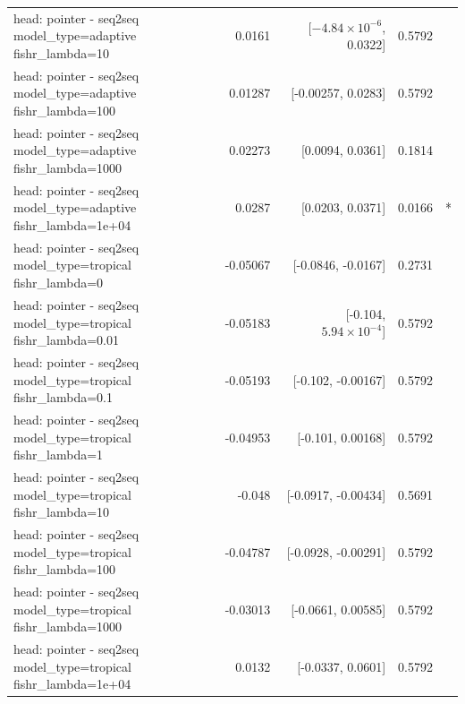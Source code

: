 \documentclass[10pt]{article}
\makeatletter
\newcommand{\stackcell}[1]{\begin{tabular}[t]{@{}l@{}}#1\end{tabular}}
\makeatother
\begin{document}
{\begin{longtable}{lrrrl}
\stackcell{head: pointer - seq2seq\\\footnotesize model\_type=adaptive fishr\_lambda=10 } & 0.0161 & [$-4.84\times10^{-6}$, 0.0322] & 0.5792 & \\
\stackcell{head: pointer - seq2seq\\\footnotesize model\_type=adaptive fishr\_lambda=100 } & 0.01287 & [-0.00257, 0.0283] & 0.5792 & \\
\stackcell{head: pointer - seq2seq\\\footnotesize model\_type=adaptive fishr\_lambda=1000 } & 0.02273 & [0.0094, 0.0361] & 0.1814 & \\
\stackcell{head: pointer - seq2seq\\\footnotesize model\_type=adaptive fishr\_lambda=1e+04 } & 0.0287 & [0.0203, 0.0371] & 0.0166 & *\\
\stackcell{head: pointer - seq2seq\\\footnotesize model\_type=tropical fishr\_lambda=0 } & -0.05067 & [-0.0846, -0.0167] & 0.2731 & \\
\stackcell{head: pointer - seq2seq\\\footnotesize model\_type=tropical fishr\_lambda=0.01 } & -0.05183 & [-0.104, $5.94\times10^{-4}$] & 0.5792 & \\
\stackcell{head: pointer - seq2seq\\\footnotesize model\_type=tropical fishr\_lambda=0.1 } & -0.05193 & [-0.102, -0.00167] & 0.5792 & \\
\stackcell{head: pointer - seq2seq\\\footnotesize model\_type=tropical fishr\_lambda=1 } & -0.04953 & [-0.101, 0.00168] & 0.5792 & \\
\stackcell{head: pointer - seq2seq\\\footnotesize model\_type=tropical fishr\_lambda=10 } & -0.048 & [-0.0917, -0.00434] & 0.5691 & \\
\stackcell{head: pointer - seq2seq\\\footnotesize model\_type=tropical fishr\_lambda=100 } & -0.04787 & [-0.0928, -0.00291] & 0.5792 & \\
\stackcell{head: pointer - seq2seq\\\footnotesize model\_type=tropical fishr\_lambda=1000 } & -0.03013 & [-0.0661, 0.00585] & 0.5792 & \\
\stackcell{head: pointer - seq2seq\\\footnotesize model\_type=tropical fishr\_lambda=1e+04 } & 0.0132 & [-0.0337, 0.0601] & 0.5792 & \\

\end{longtable}}
\end{document}
